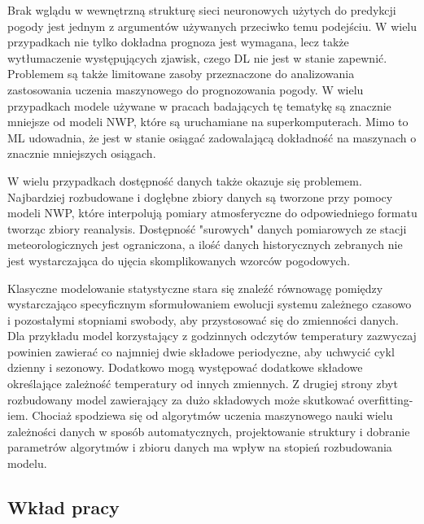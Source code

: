 Brak wglądu w wewnętrzną strukturę sieci neuronowych użytych do predykcji pogody jest jednym
z argumentów używanych przeciwko temu podejściu. W wielu przypadkach nie tylko dokładna
prognoza jest wymagana, lecz także wytłumaczenie występujących zjawisk, czego DL nie jest w 
stanie zapewnić. Problemem są także limitowane zasoby przeznaczone do analizowania zastosowania
uczenia maszynowego do prognozowania pogody. W wielu przypadkach modele używane w pracach
badających tę tematykę są znacznie mniejsze od modeli NWP, które są uruchamiane na superkomputerach.
Mimo to ML udowadnia, że jest w stanie osiągać zadowalającą dokładność na maszynach o znacznie
mniejszych osiągach.

W wielu przypadkach dostępność danych także okazuje się problemem. Najbardziej rozbudowane 
i dogłębne zbiory danych są tworzone przy pomocy modeli NWP, które interpolują pomiary atmosferyczne
do odpowiedniego formatu tworząc zbiory reanalysis. Dostępność "surowych" danych pomiarowych 
ze stacji meteorologicznych
jest ograniczona, a ilość danych historycznych zebranych nie jest wystarczająca do ujęcia 
skomplikowanych wzorców pogodowych.

Klasyczne modelowanie statystyczne stara się znaleźć równowagę pomiędzy wystarczająco specyficznym
sformułowaniem ewolucji systemu zależnego czasowo i pozostałymi stopniami swobody, aby 
przystosować się do zmienności danych\cite{can-dl-beat-numerical}. Dla przykładu 
model korzystający z godzinnych odczytów temperatury zazwyczaj powinien zawierać co najmniej
dwie składowe periodyczne, aby uchwycić cykl dzienny i sezonowy. Dodatkowo mogą występować
dodatkowe składowe określające zależność temperatury od innych zmiennych. Z drugiej strony
zbyt rozbudowany model zawierający za dużo składowych może skutkować overfitting-iem.
Chociaż spodziewa się od algorytmów uczenia maszynowego nauki wielu zależności danych
w sposób automatycznych, projektowanie struktury i dobranie parametrów algorytmów i
zbioru danych ma wpływ na stopień rozbudowania modelu.

\subsection{Wkład pracy}

